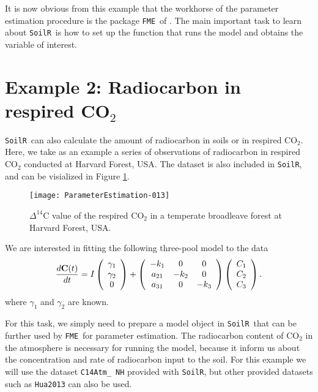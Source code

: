 \documentclass[a4paper]{article}
\newcommand{\SoilR}{\texttt{SoilR}}
\newcommand{\FME}{\texttt{FME}}
\begin{document}
\clearpage
It is now obvious from this example that the workhorse of the parameter estimation procedure is the package \FME \, of \citet{Soetaert}. The main important task to learn about \SoilR \, is how to set up the function that runs the model and obtains the variable of interest.  

\section*{Example 2: Radiocarbon in respired CO$_2$}
\SoilR \, can also calculate the amount of radiocarbon in soils or in respired CO$_2$. Here, we take as an example a series of observations of radiocarbon in respired CO$_2$ conducted at Harvard Forest, USA. The dataset is also included in \SoilR, and can be visialized in Figure \ref{fig:radiocarbondata}.

\begin{figure}
  \centering
\texttt{[image: ParameterEstimation-013]}
  \caption{$\Delta^{14}$C value of the respired CO$_2$ in a temperate broadleave forest at Harvard Forest, USA.}
  \label{fig:radiocarbondata}
\end{figure}

We are interested in fitting the following three-pool model to the data
\begin{equation} \label{eq:HarvardForestModel}
\frac{d {\bf C}(t)}{dt} = I \left( \begin{array}{c} \gamma_1 \\ \gamma_2 \\ 0 \end{array} \right) +
\left( \begin{array}{ccc}
-k_1 & 0 & 0 \\
a_{21} & -k_2 & 0 \\
a_{31} & 0 & -k_3
\end{array} \right)
\left( \begin{array}{c} C_1 \\ C_2 \\ C_3 \end{array} \right).
\end{equation}
where $\gamma_1$ and $\gamma_2$ are known. 

For this task, we simply need to prepare a model object in \SoilR \, that can be further used by \FME \, for parameter estimation. 
The radiocarbon content of CO$_2$ in the atmosphere is necessary for running the model, because it inform us about the concentration and rate of radiocarbon input to the soil. For this example we will use the dataset {\tt C14Atm\_ NH} provided with \SoilR, but other provided datasets such as {\tt Hua2013} can also be used. 
\end{document}
